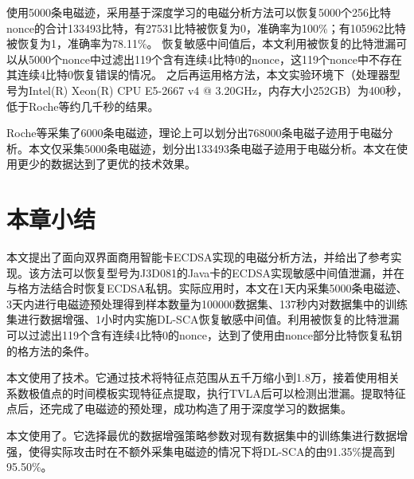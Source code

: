 {{{	使用5000条电磁迹，采用基于深度学习的电磁分析方法可以恢复5000个256比特nonce的合计133493比特，有27531比特被恢复为0，准确率为100\%；有105962比特被恢复为1，准确率为78.11\%。
	恢复敏感中间值后，本文利用被恢复的比特泄漏可以从5000个nonce中过滤出119个含有连续4比特0的nonce，这119个nonce中不存在其连续4比特0恢复错误的情况。
	之后再运用格方法，本文实验环境下（处理器型号为Intel(R) Xeon(R) CPU E5-2667 v4 @ 3.20GHz，内存大小252GB）为400秒，低于Roche等\citep{Roche21}约几千秒的结果。
	
	Roche等\citep{Roche21}采集了6000条电磁迹，理论上可以划分出768000条电磁子迹用于电磁分析。本文仅采集5000条电磁迹，划分出133493条电磁子迹用于电磁分析。本文在使用更少的数据达到了更优的技术效果。
	
	}

	\section{本章小结}
	{\color{\xchange}
	
%	
	本文提出了面向双界面商用智能卡ECDSA实现的电磁分析方法，并给出了参考实现。该方法可以恢复型号为J3D081的Java卡的ECDSA实现敏感中间值泄漏，并在与格方法结合时恢复ECDSA私钥。实际应用时，本文在1天内采集5000条电磁迹、3天内进行电磁迹预处理得到样本数量为100000数据集、137秒内对数据集中的训练集进行数据增强、1小时内实施DL-SCA恢复敏感中间值。利用被恢复的比特泄漏可以过滤出119个含有连续4比特0的nonce，达到了使用由nonce部分比特恢复私钥的格方法的条件。
	
	本文使用了\yuchuli 技术。它通过\poifanwei 技术将特征点范围从五千万缩小到1.8万，接着使用相关系数极值点的时间模板实现特征点提取，执行TVLA后可以检测出泄漏。提取特征点后，还完成了电磁迹的预处理，成功构造了用于深度学习的数据集。
	
	本文使用了\shujuzengqiang。它选择最优的数据增强策略参数对现有数据集中的训练集进行数据增强，使得实际攻击时在不额外采集电磁迹的情况下将DL-SCA的\zyx 由91.35\%提高到95.50\%。
	
}}}
